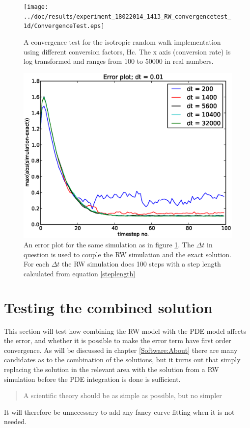 \begin{figure}[H]
 \centering
 \texttt{[image: ../doc/results/experiment\_18022014\_1413\_RW\_convergencetest\_1d/ConvergenceTest.eps]}
 \caption[Convergence test RW]{A convergence test for the isotropic random walk implementation using different conversion factors, Hc. The x axis (conversion rate) is log transformed and ranges from 100 to 50000 in real numbers.}
 \label{ConvergenceTestRW}
\end{figure}
\begin{figure}[H]
 \centering
 \includegraphics[scale=0.7]{../doc/results/experiment_18022014_1413_RW_convergencetest_1d/results/errorplot.eps}
 \caption[Error plot RW]{An error plot for the same simulation as in figure \ref{ConvergenceTestRW}. The $\Delta t$ in question is used to couple the RW simulation and the exact solution. For each $\Delta t$ the RW simulation does 100 steps with a step length calculated from equation \eqref{steplength}}
\end{figure}




\section{Testing the combined solution}

This section will test how combining the RW model with the PDE model affects the error, and whether it is possible to make the error term have first order convergence.
As will be discussed in chapter \ref{Software:About} there are many candidates as to the combination of the solutions, but it turns out that simply replacing the solution in the relevant area with the solution from a RW simulation before the PDE integration is done is sufficient. 
\begin{quotation}
 A scientific theory should be as simple as possible, but no simpler
\end{quotation}
It will therefore be unnecessary to add any fancy curve fitting when it is not needed. 

